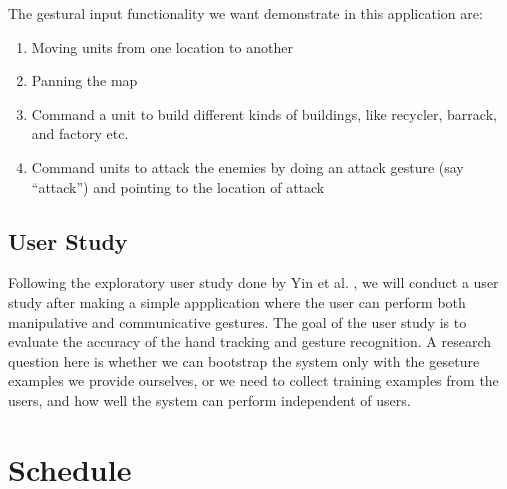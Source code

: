 The gestural input functionality we want demonstrate in this application are:

\begin{enumerate}
  \item Moving units from one location to another
  \item Panning the map
  \item Command a unit to build different kinds of buildings, like recycler,
  barrack, and factory etc.
  \item Command units to attack the enemies by doing an attack gesture (say
  ``attack'') and pointing to the location of attack
\end{enumerate}

\subsection{User Study}\label{sec:userStudy}
Following the exploratory user study done by Yin et al. \cite{yin10}, we will
conduct a user study after making a simple appplication where the user can
perform both manipulative and communicative gestures. The goal of the user study
is to evaluate the accuracy of the hand tracking and gesture recognition. A
research question here is whether we can bootstrap the system only with the
geseture examples we provide ourselves, or we need to collect training examples
from the users, and how well the system can perform independent of users.

\section{Schedule}
% 
% 
% 
% 
% 
% 
% 
% 

